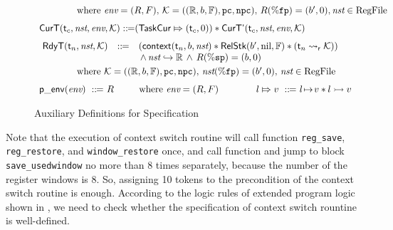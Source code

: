 \begin{figure}[!t]
\[\begin{array}{l}
\begin{array}{lll}
            \end{array}
            \\
            \\[-9pt]
            \qquad\qquad
            \text{where} \ \env = (\RFile, \Wstack), \, 
            \hthrdlocalst = ((\hRfile, \block, \hWstk), \pc, \npc), 
            \, \RFile(\fpreg) = (\block', 0), \nst \in \text{RegFile} \\
            \\[-5pt]
            \RelCurT{\thrdid_c}{\nst}{\env}{\hthrdlocalst} \define 
            (\relmsto{\TaskCur}{(\thrdid_c, 0)}) \sepstar 
            \RelCurTAux{\thrdid_c}{\nst}{\env}{\hthrdlocalst} \\
            \\[-5pt]
            \hspace*{-0.15em}
            \begin{array}{lll}
                \RelRdyT{\thrdid_n}{\nst}{\hthrdlocalst} & \define & 
                (\relcontext{\thrdid_n}{\block}{\nst}
                \sepstar 
                \RelStk{\block'}{\nil}{\hWstk} \sepstar 
                (\astRdyCont{\thrdid_n}{\hthrdlocalst})) \\
                & &  
                \, \land \, 
                \Rinj{\nst}{\hRfile} \, \land \, \RFile(\spreg) = (\block, 0)
            \end{array}  \\
            \\[-9pt]
            \qquad\qquad
            \text{where} \ \hthrdlocalst = ((\hRfile, \block, \hWstk), \pc, \npc), 
            \, \nst(\fpreg) = (\block', 0), \, \nst \in \text{RegFile} \\
            \\[-5pt]
            \pEnv{\env} \ \define \ \RFile \qquad \ \ \text{where} \ \env = (\RFile, \Wstack)
            \qquad\qquad
            \relmsto{\loc}{\val} \ \define \ 
            \msto{\loc}{\val} \sepstar \hmsto{\loc}{\val} 
        \end{array}
    \]
    \caption{Auxiliary Definitions for Specification}
    \label{def:aux-def-spec}
\end{figure}

Note that the execution of context switch routine will 
call function \texttt{reg\_save}, \texttt{reg\_restore}, and  
\texttt{window\_restore} once, and call function \WinSave{} 
and jump to block \texttt{save\_usedwindow} no more than 8 times separately, 
because the number of the register windows is 8. So, assigning 10 tokens 
to the precondition of the context switch routine is enough. 
According to the logic rules of extended program logic shown 
in \Fig{\ref{fig:Selected Inference Rules for Refinement Verification}}, 
we need to check whether the specification of context switch rountine 
is well-defined. 

